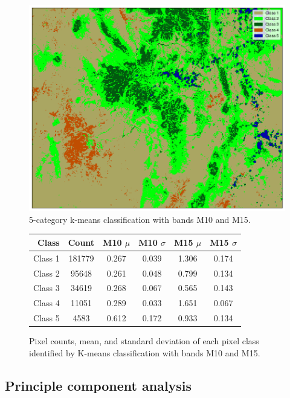 \documentclass[12pt]{article}
\begin{document}
\begin{figure}[h!]
    \centering
    \includegraphics[width=.7\linewidth]{figures/p6/k-means_M10+M15_5cat_noborder.png}
    \caption{5-category k-means classification with bands M10 and M15. }
    \label{p6_noborder}
\end{figure}

\begin{figure}[h!]
    \centering
    \begin{tabular}{r | C | C C | C C |}
        Class & \textnormal{Count} & \textnormal{M10 $\mu$} & \textnormal{M10 $\sigma$} & \textnormal{M15 $\mu$} & \textnormal{M15 $\sigma$} \\
        \hline
        Class 1 & 181779 & 0.267 & 0.039 & 1.306 & 0.174 \\
        Class 2 & 95648 & 0.261 & 0.048 & 0.799 & 0.134 \\
        Class 3 & 34619 & 0.268 & 0.067 & 0.565 & 0.143 \\
        Class 4 & 11051 & 0.289 & 0.033 & 1.651 & 0.067 \\
        Class 5 & 4583 & 0.612 & 0.172 & 0.933 & 0.134 \\
    \end{tabular}
    \caption{Pixel counts, mean, and standard deviation of each pixel class identified by K-means classification with bands M10 and M15.}
\end{figure}

\clearpage

\subsection{Principle component analysis}
\end{document}
